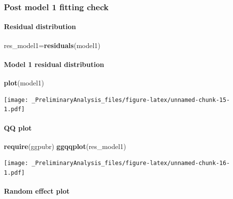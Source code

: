 \documentclass[
]{article}
\newenvironment{Shaded}{\begin{snugshade}}{\end{snugshade}}
\newcommand{\KeywordTok}[1]{\textcolor[rgb]{0.13,0.29,0.53}{\textbf{#1}}}
\newcommand{\NormalTok}[1]{#1}
\begin{document}
\hypertarget{post-model-1-fitting-check}{%
\subsubsection{Post model 1 fitting
check}\label{post-model-1-fitting-check}}

\hypertarget{residual-distribution}{%
\paragraph{Residual distribution}\label{residual-distribution}}

\begin{Shaded}
\begin{Highlighting}[]
\NormalTok{res_model1=}\KeywordTok{residuals}\NormalTok{(model1)}
\end{Highlighting}
\end{Shaded}

\hypertarget{model-1-residual-distribution}{%
\paragraph{Model 1 residual
distribution}\label{model-1-residual-distribution}}

\begin{Shaded}
\begin{Highlighting}[]
\KeywordTok{plot}\NormalTok{(model1)}
\end{Highlighting}
\end{Shaded}

\texttt{[image: \_PreliminaryAnalysis\_files/figure-latex/unnamed-chunk-15-1.pdf]}

\hypertarget{qq-plot}{%
\paragraph{QQ plot}\label{qq-plot}}

\begin{Shaded}
\begin{Highlighting}[]
\KeywordTok{require}\NormalTok{(ggpubr)}
\KeywordTok{ggqqplot}\NormalTok{(res_model1)}
\end{Highlighting}
\end{Shaded}

\texttt{[image: \_PreliminaryAnalysis\_files/figure-latex/unnamed-chunk-16-1.pdf]}

\hypertarget{random-effect-plot}{%
\paragraph{Random effect plot}\label{random-effect-plot}}
\end{document}
